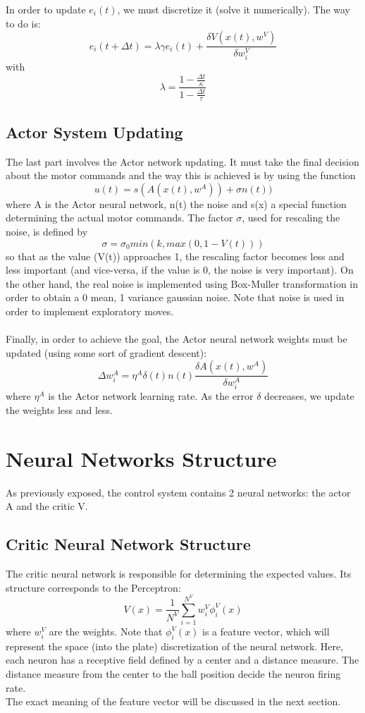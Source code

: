 \documentclass{article}
\begin{document}
In order to update \(e_{i}(t)\), we must discretize it (solve it numerically). The way to do is:
\[
e_{i}(t + \Delta t) = \lambda \gamma e_{i}(t) + \frac{\delta V(x(t), w^{V})}{\delta w_{i}^{V}}
\]
with
\[
\lambda = \frac{1 - \frac{\Delta t}{\kappa}}{1 - \frac{\Delta t}{\tau}}
\]


\subsection{Actor System Updating}
The last part involves the Actor network updating. It must take the final decision about the motor commands and the way this is achieved is by using the function
\[
u(t) = s(A(x(t), w^{A})) + \sigma n(t))
\]
where A is the Actor neural network, n(t) the noise and s(x) a special function determining the actual motor commands. The factor \(\sigma\), used for rescaling the noise, is defined by
\[
\sigma = \sigma_{0} min(k, max(0, 1 - V(t)))
\]
so that as the value (V(t)) approaches 1, the rescaling factor becomes less and less important (and vice-versa, if the value is 0, the noise is very important). On the other hand, the real noise is implemented using Box-Muller transformation in order to obtain a 0 mean, 1 variance gaussian noise. Note that noise is used in order to implement exploratory moves. \\ \\


Finally, in order to achieve the goal, the Actor neural network weights must be updated (using some sort of gradient descent):  
\[
\Delta w_{i}^{A} = \eta^{A}\delta (t)n(t)\frac{\delta A(x(t), w^{A})}{\delta w_{i}^{A}}
\]
where \(\eta^{A}\) is the Actor network learning rate. As the error \(\delta\) decreases, we update the weights less and less. \\



\section{Neural Networks Structure}
As previously exposed, the control system contains 2 neural networks: the actor A and the critic V.

\subsection{Critic Neural Network Structure}
The critic neural network is responsible for determining the expected values. Its structure corresponds to the Perceptron:
\[
V(x) = \frac{1}{N^{V}} \sum_{i=1}^{N^{V}}{w_{i}^{V}\phi_{i}^{V}(x)}
\]
where \(w_{i}^{V}\) are the weights. Note that \(\phi_{i}^{V}(x)\) is a feature vector, which will represent the space (into the plate) discretization of the neural network. Here, each neuron has a receptive field defined by a center and a distance measure. The distance measure from the center to the ball position decide the neuron firing rate.\\
The exact meaning of the feature vector will be discussed in the next section.
\end{document}
